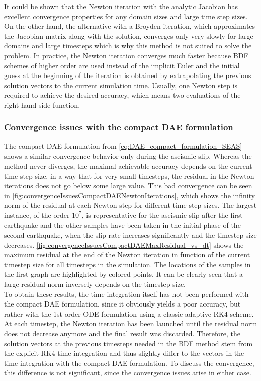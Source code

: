 It could be shown that the Newton iteration with the analytic Jacobian has excellent convergence properties for any domain sizes and large time step sizes. On the other hand, the alternative with a Broyden iteration, which approximates the Jacobian matrix along with the solution, converges only very slowly for large domains and large timesteps which is why this method is not suited to solve the problem. In practice, the  Newton iteration converges much faster because BDF schemes of higher order are used instead of the implicit Euler and the initial guess at the beginning of the iteration is obtained by extrapolating the previous solution vectors to the current simulation time. Usually, one Newton step is required to achieve the desired accuracy, which means two evaluations of the right-hand side function. \\

\subsubsection{Convergence issues with the compact DAE formulation}
The compact DAE formulation from \autoref{eq:DAE_compact_formulation_SEAS} shows a similar convergence behavior only during the aseismic slip. Whereas the method never diverges, the maximal achievable accuracy depends on the current time step size, in a way that for very small timesteps, the residual in the Newton iterations does not go below some large value. This bad convergence can be seen in \autoref{fig:convergenceIssuesCompactDAENewtonIterations}, which shows the infinity norm of the residual at each Newton step for different time step sizes. The largest instance, of the order $10^7$, is representative for the aseismic slip after the first earthquake and the other samples have been taken in the initial phase of the second earthquake, when the slip rate increases significantly and the timestep size decreases. \autoref{fig:convergenceIssuesCompactDAEMaxResidual_vs_dt} shows the maximum residual at the end of the Newton iteration in function of the current timestep size for all timesteps in the simulation. The locations of the samples in the first graph are highlighted by colored points. It can be clearly seen that a large residual norm inversely depends on the timestep size. \\ 
To obtain these results, the time integration itself has not been performed with the compact DAE formulation, since it obviously yields a poor accuracy, but rather with the 1st order ODE formulation using a classic adaptive RK4 scheme. At each timestep, the Newton iteration has been launched until the residual norm does not decrease anymore and the final result was discarded. Therefore, the solution vectors at the previous timesteps needed in the BDF method stem from the explicit RK4 time integration and thus slightly differ to the vectors in the time integration with the compact DAE formulation. To discuss the convergence, this difference is not significant, since the convergence issues arise in either case. \\

